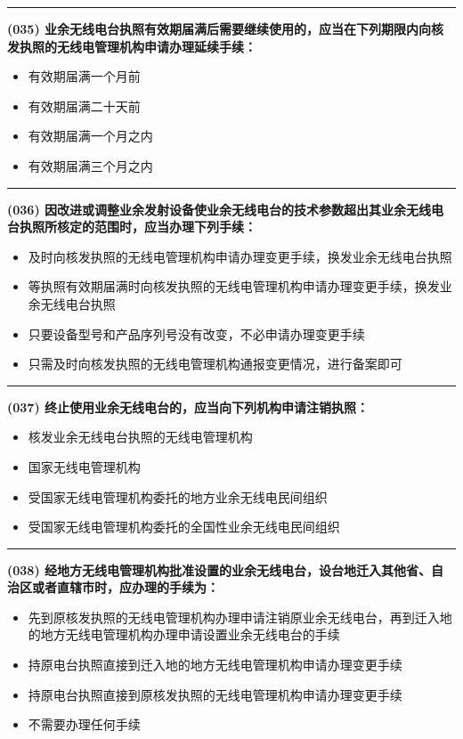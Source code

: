 \documentclass[twocolumn]{ctexart}  %
\begin{document}
\noindent\rule{0.5\textwidth}{1pt}
\heiti \textbf{(035) 业余无线电台执照有效期届满后需要继续使用的，应当在下列期限内向核发执照的无线电管理机构申请办理延续手续：} \songti {\color{gray} [LK0044] }
\begin{itemize}
	\item  有效期届满一个月前
	\item  有效期届满二十天前
	\item  有效期届满一个月之内
	\item  有效期届满三个月之内
\end{itemize}


\noindent\rule{0.5\textwidth}{1pt}
\heiti \textbf{(036) 因改进或调整业余发射设备使业余无线电台的技术参数超出其业余无线电台执照所核定的范围时，应当办理下列手续：} \songti {\color{gray} [LK0045] }
\begin{itemize}
	\item  及时向核发执照的无线电管理机构申请办理变更手续，换发业余无线电台执照
	\item  等执照有效期届满时向核发执照的无线电管理机构申请办理变更手续，换发业余无线电台执照
	\item  只要设备型号和产品序列号没有改变，不必申请办理变更手续
	\item  只需及时向核发执照的无线电管理机构通报变更情况，进行备案即可
\end{itemize}


\noindent\rule{0.5\textwidth}{1pt}
\heiti \textbf{(037) 终止使用业余无线电台的，应当向下列机构申请注销执照：} \songti {\color{gray} [LK0046] }
\begin{itemize}
	\item  核发业余无线电台执照的无线电管理机构
	\item  国家无线电管理机构
	\item  受国家无线电管理机构委托的地方业余无线电民间组织
	\item  受国家无线电管理机构委托的全国性业余无线电民间组织
\end{itemize}


\noindent\rule{0.5\textwidth}{1pt}
\heiti \textbf{(038) 经地方无线电管理机构批准设置的业余无线电台，设台地迁入其他省、自治区或者直辖市时，应办理的手续为：} \songti {\color{gray} [LK0089] }
\begin{itemize}
	\item  先到原核发执照的无线电管理机构办理申请注销原业余无线电台，再到迁入地的地方无线电管理机构办理申请设置业余无线电台的手续
	\item  持原电台执照直接到迁入地的地方无线电管理机构申请办理变更手续
	\item  持原电台执照直接到原核发执照的无线电管理机构申请办理变更手续
	\item  不需要办理任何手续
\end{itemize}
\end{document}
